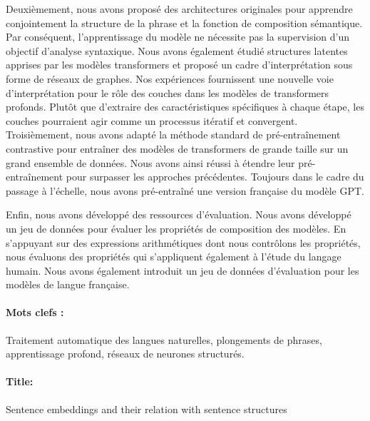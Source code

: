 Deuxièmement, nous avons proposé des architectures originales pour apprendre conjointement la structure de la phrase et la fonction de composition sémantique. Par conséquent, l'apprentissage du modèle ne nécessite pas la supervision d'un objectif d'analyse syntaxique. Nous avons également étudié structures latentes apprises par les modèles transformers et proposé un cadre d’interprétation sous forme de réseaux de graphes. Nos expériences fournissent une nouvelle voie d'interprétation pour le rôle des couches dans les modèles de transformers profonds. Plutôt que d'extraire des caractéristiques spécifiques à chaque étape, les couches pourraient agir comme un processus itératif et convergent.
Troisièmement, nous avons adapté la méthode standard de pré-entraînement contrastive pour entraîner des modèles de transformers de grande taille sur un grand ensemble de données. Nous avons ainsi réussi à étendre leur pré-entraînement pour surpasser les approches précédentes. Toujours dans le cadre du passage à l’échelle, nous avons pré-entraîné une version française du modèle GPT.

Enfin, nous avons développé des ressources d'évaluation. Nous avons développé un jeu de données pour évaluer les propriétés de composition des modèles. En s’appuyant sur des expressions arithmétiques dont nous contrôlons les propriétés, nous évaluons des propriétés qui s'appliquent également à l'étude du langage humain. Nous avons également introduit un jeu de données d'évaluation pour les modèles de langue française.


\paragraph{Mots clefs :} Traitement automatique des langues naturelles, plongements de phrases, apprentissage profond, réseaux de neurones structurés.


\newpage

\paragraph{Title:} Sentence embeddings and their relation with sentence structures

